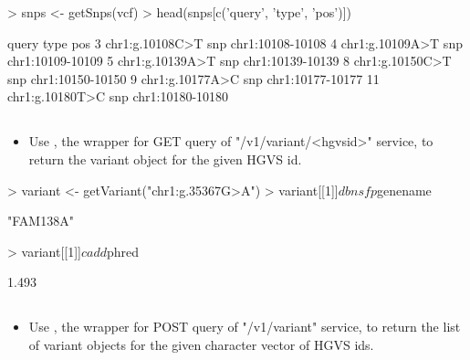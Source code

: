 \documentclass[12pt]{article}
\begin{document}
\begin{Schunk}
\begin{Sinput}
> snps <- getSnps(vcf)
> head(snps[c('query', 'type', 'pos')])
\end{Sinput}
\begin{Soutput}
             query type              pos
3  chr1:g.10108C>T  snp chr1:10108-10108
4  chr1:g.10109A>T  snp chr1:10109-10109
5  chr1:g.10139A>T  snp chr1:10139-10139
8  chr1:g.10150C>T  snp chr1:10150-10150
9  chr1:g.10177A>C  snp chr1:10177-10177
11 chr1:g.10180T>C  snp chr1:10180-10180
\end{Soutput}
\end{Schunk}


\subsection{}

\begin{itemize}
\item Use , the wrapper for GET query of "/v1/variant/<hgvsid>" service, to return the variant object for the given HGVS id.
\end{itemize} 


\begin{Schunk}
\begin{Sinput}
> variant <- getVariant("chr1:g.35367G>A")
> variant[[1]]$dbnsfp$genename
\end{Sinput}
\begin{Soutput}
[1] "FAM138A"
\end{Soutput}
\begin{Sinput}
> variant[[1]]$cadd$phred
\end{Sinput}
\begin{Soutput}
[1] 1.493
\end{Soutput}
\end{Schunk}

\subsection{}

\begin{itemize}
\item Use , the wrapper for POST query of "/v1/variant" service, to return the list of variant objects for the given character vector of HGVS ids.
\end{itemize} 
\end{document}
